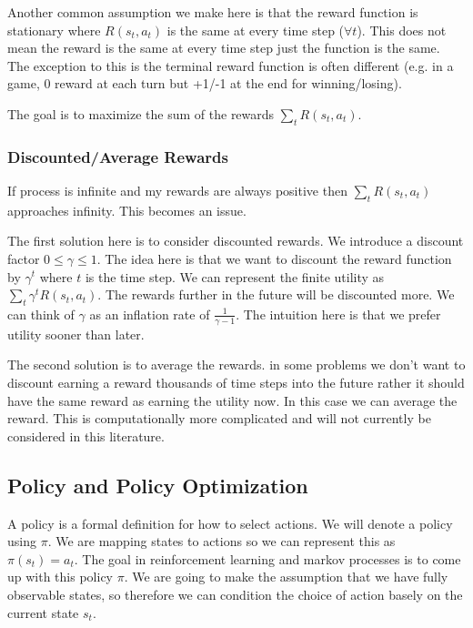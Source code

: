 \documentclass[12pt]{article}
\begin{document}
        Another common assumption we make here is that the reward function is stationary where $R(s_t, a_t)$ is the same
        at every time step ($\forall t$). This does not mean the reward is the same at every time step just the function
        is the same. The exception to this is the terminal reward function is often different (e.g. in a game, 0 reward
        at each turn but +1/-1 at the end for winning/losing).

        The goal is to maximize the sum of the rewards $\sum_t R(s_t, a_t)$.

        \subsubsection{Discounted/Average Rewards}
            If process is infinite and my rewards are always positive then $\sum_t R(s_t, a_t)$ approaches infinity.
            This becomes an issue. 

            The first solution here is to consider discounted rewards. We introduce a discount factor $0 \leq \gamma
            \leq 1$. The idea here is that we want to discount the reward function by $\gamma^t$ where $t$ is the time
            step. We can represent the finite utility as $\sum_t \gamma^t R(s_t, a_t)$. The rewards further in the
            future will be discounted more. We can think of $\gamma$ as an inflation rate of $\frac{1}{\gamma - 1}$. The
            intuition here is that we prefer utility sooner than later.

            The second solution is to average the rewards. in some problems we don't want to discount earning a reward
            thousands of time steps into the future rather it should have the same reward as earning the utility now. In
            this case we can average the reward. This is computationally more complicated and will not currently be
            considered in this literature.

    \subsection{Policy and Policy Optimization}
        A policy is a formal definition for how to select actions. We will denote a policy using $\pi$. We are mapping
        states to actions so we can represent this as $\pi(s_t) = a_t$. The goal in reinforcement learning and markov
        processes is to come up with this policy $\pi$. We are going to make the assumption that we have fully
        observable states, so therefore we can condition the choice of action basely on the current state $s_t$.
\end{document}
